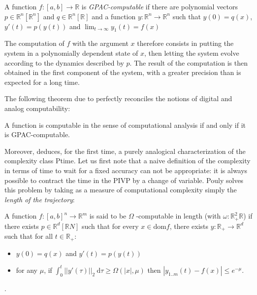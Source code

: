 \documentclass[graybox]{svmult}
\begin{document}
\begin{definition} \cite{GC03}
  A function $ f: [a, b] \to \mathbb{R} $ is \emph{GPAC-computable} if there are polynomial vectors $ p \in \mathbb{R} ^ n [\mathbb{R}^n]$ and $ q\in\mathbb{R} ^ n[\mathbb{R}]$
  and a function $y : \mathbb{R}^n\to \mathbb{R}^n$ such that $y(0)=q(x) $, $ y'(t) = p (y (t)) $ and $ \lim_{t \to \infty} y_1(t) = f(x)$
\end{definition}

The computation of $ f $ with the argument $ x $ therefore consists in putting the system in a polynomially dependent state of $ x $, then letting the system evolve according to the dynamics described by $ p $. The result of the computation is then obtained in the first component of the system, with a greater precision than is expected for a long time.

The following theorem due to \cite{bournez2006general} perfectly reconciles the notions of digital and analog computability:

\begin{theorem} \cite{bournez2006general} \label{Bournez}
A function is computable in the sense of computational analysis if and only if it is GPAC-computable.
\end{theorem}




Moreover, \cite{Pouly15} deduces, for the first time, a purely analogical characterization of the complexity class Ptime.
Let us first note that a naive definition of the complexity in terms of time to wait for a fixed accuracy can not be appropriate:
it is always possible to contract the time in the PIVP by a change of variable.
Pouly solves this problem by taking as a measure of computational complexity simply the \emph{length of the trajectory}:

\begin{definition} \cite{Pouly15}
A function $ f: [a, b] ^ n \to \mathbb{R} ^ m $ is said to be $ \Omega $ -computable in length (with $ \omega: \mathbb{R} _ + ^ 2 \mathbb{R} $) if there exists $ p \in \mathbb{R} ^ d [\mathbb{R} N] $ such that for every $ x \in \mathrm{dom} f $, there exists $y : \mathbb{R}_+ \to \mathbb{R}^d$ such that for all $t \in \mathbb{R}_+$:
\begin{itemize}
\item $ y (0) = q (x) $ and $ y'(t) = p (y (t)) $
\item for any $ \mu $, if $\int_0^t ||y'(\tau)||_2\ \mathrm{d}\tau \geq \Omega(|x|, \mu)$ then $|y_{1..m}(t) - f(x)| \leq e^{-\mu}$.
\end{itemize}.
\end{definition}
\end{document}
